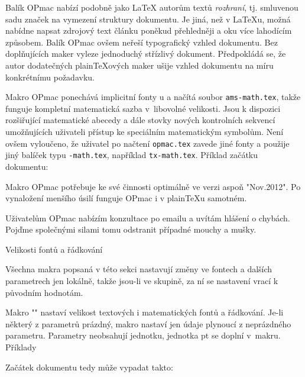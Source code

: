 Balík OPmac nabízí podobně jako \LaTeX{} autorům textů {\it rozhraní}, tj.
smluvenou sadu značek na vymezení struktury dokumentu. Je jiná, než v
\LaTeX{}u, možná nabídne napsat zdrojový text článku poněkud přehledněji a
oku více lahodícím způsobem. Balík OPmac ovšem neřeší typografický vzhled
dokumentu. Bez doplňujících maker vyleze jednoduchý střízlivý dokument.
Předpokládá se, že autor dodatečných plain\TeX{}ových maker ušije vzhled
dokumentu na míru konkrétnímu požadavku.

Makro OPmac ponechává implicitní fonty \csplain{}u a načítá 
soubor {\tt ams-math.tex}, takže funguje kompletní matematická sazba
v~libovolné velikosti. Jsou k dispozici rozšiřující matematické
abecedy a dále stovky nových kontrolních sekvencí umožňujících uživateli 
přístup ke speciálním matematickým symbolům. 
Není ovšem vyloučeno, že uživatel
po načtení {\tt opmac.tex} zavede jiné fonty a použije jiný balíček typu
{\tt *-math.tex}, například {\tt tx-math.tex}. Příklad začátku dokumentu:

\begtt
\chyph            %
\typosize[12/14]  %
\endtt

Makro OPmac potřebuje ke své činnosti \csplain{} optimálně ve verzi aspoň
"Nov.2012". Po vynaložení menšího úsilí funguje OPmac i v plain\TeX{}u
samotném.

Uživatelům OPmac nabízím konzultace po emailu a uvítám hlášení o chybách.
Pojďme společnými silami tomu odstranit případné mouchy a mušky.


\sec Velikosti fontů a řádkování

Všechna makra popsaná v této sekci nastavují změny ve fontech a dalších
parametrech jen lokálně, takže jsou-li ve skupině, 
za ní se nastavení vrací k původním hodnotám.

Makro "" nastaví velikost textových i
matematických fontů a řádkování. Je-li některý z parametrů prázdný, makro
nastaví jen údaje plynoucí z neprázdného parametru. 
Parametry neobsahují jednotku, jednotka pt se doplní v~makru. Příklady

\begtt
\typosize[10/12]    %
\typosize[11/12.5]  %
\typosize[8/]       %
\endtt

Začátek dokumentu tedy může vypadat takto:

